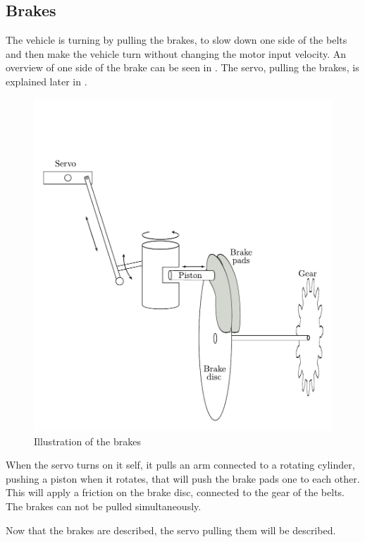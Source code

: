 \subsection{Brakes}

The vehicle is turning by pulling the brakes, to slow down one side of the belts and then make the vehicle turn without changing the motor input velocity. An overview of one side of the brake can be seen in . The servo, pulling the brakes, is explained later in .

 \begin{figure}[H]
	\centering
	\includegraphics[scale=0.6]{figures/brakeDescription.pdf}
	\caption{Illustration of the brakes}
	\label{Brakes}
\end{figure}

When the servo turns on it self, it pulls an arm connected to a rotating cylinder, pushing a piston when it rotates, that will push the brake pads one to each other. This will apply a friction on the brake disc, connected to the gear of the belts. The brakes can not be pulled simultaneously.

Now that the brakes are described, the servo pulling them will be described.